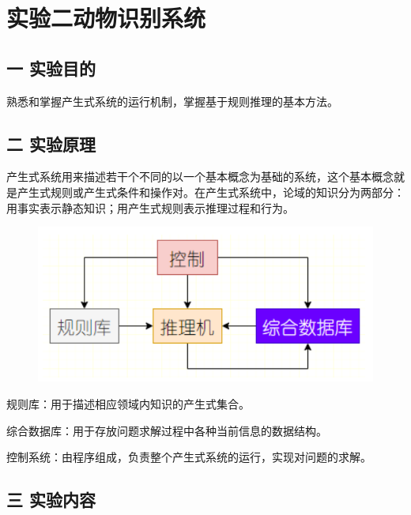 \documentclass[a4paper]{article}   %
\begin{document}
	
 	\newpage
 	\section*{实验二\quad 动物识别系统}
 	\subsection*{一 \quad 实验目的}
 	熟悉和掌握产生式系统的运行机制，掌握基于规则推理的基本方法。
 	\subsection*{二 \quad 实验原理}
 	产生式系统用来描述若干个不同的以一个基本概念为基础的系统，这个基本概念就是产生式规则或产生式条件和操作对。在产生式系统中，论域的知识分为两部分：用事实表示静态知识；用产生式规则表示推理过程和行为。\par
 	\begin{figure}[!htbp]
 		\centering
 		\includegraphics[scale=0.8]{./resource/f1.png}
 	\end{figure}
 	规则库：用于描述相应领域内知识的产生式集合。\par 
 	综合数据库：用于存放问题求解过程中各种当前信息的数据结构。\par 
 	控制系统：由程序组成，负责整个产生式系统的运行，实现对问题的求解。\par 
 	\subsection*{三 \quad 实验内容}
\end{document}
